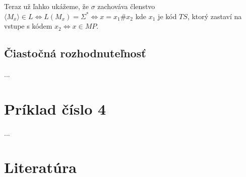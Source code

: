 \documentclass[11pt,a4paper]{article}
\begin{document}
Teraz už ľahko ukážeme, že $\sigma$ zachováva členstvo $\langle M_{x} \rangle \in L \Leftrightarrow L(M_x) = \Sigma^{*} \Leftrightarrow x=x_1\#x_2$ kde $x_1$ je kód $TS$, ktorý zastaví na vstupe s kódem $x_2 \Leftrightarrow x \in MP$.


\newpage
\subsection{Čiastočná rozhodnuteľnosť}

...

\newpage
\section{Príklad číslo 4} %

...


\newpage
\section{Literatúra} %


\begin{flushleft}
    
\end{flushleft}
\end{document}
